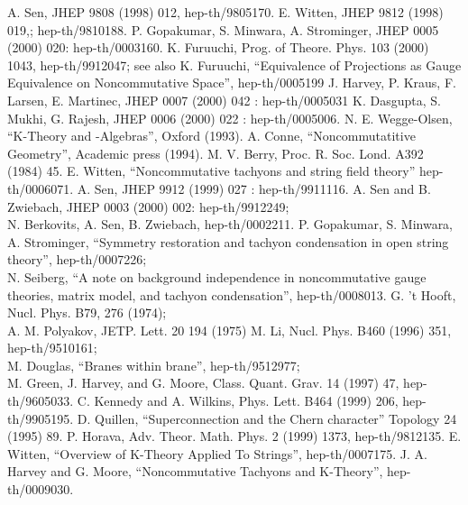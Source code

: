 \documentclass[a4paper,12pt]{article}
\begin{document}
\begin{thebibliography}{99}
 A. Sen, JHEP 9808 (1998) 012,
hep-th/9805170.
 E. Witten, JHEP 9812 (1998) 019,; hep-th/9810188.
  P. Gopakumar, S. Minwara, A. Strominger,
JHEP 0005 (2000) 020: hep-th/0003160.
 K. Furuuchi, Prog. of Theore. Phys. 103 (2000) 1043,
hep-th/9912047;
see also K. Furuuchi, 
``Equivalence of Projections as Gauge Equivalence on
Noncommutative Space'',
hep-th/0005199
  J. Harvey, P. Kraus, F. Larsen, E. Martinec, 
	JHEP 0007 (2000) 042 : hep-th/0005031 
 K. Dasgupta, S. Mukhi, G. Rajesh,
	JHEP 0006 (2000) 022 : hep-th/0005006.
 N. E. Wegge-Olsen, ``K-Theory
and \coordHE{}-Algebras'', Oxford (1993).
 A. Conne, ``Noncommutatitive Geometry'',
Academic press (1994).
 M. V. Berry, Proc. R. Soc. Lond. A392 (1984) 45.
 E. Witten, ``Noncommutative tachyons and string
field theory'' hep-th/0006071.
 A. Sen, JHEP 9912 (1999) 027 : hep-th/9911116.
 A. Sen and B. Zwiebach, JHEP 0003 (2000) 002:
	hep-th/9912249;\\
 N. Berkovits, A. Sen, B. Zwiebach, hep-th/0002211.
 P. Gopakumar, S. Minwara, A. Strominger,
``Symmetry restoration and tachyon condensation in open string theory'',
hep-th/0007226;\\
N. Seiberg, ``A note on background independence in
noncommutative gauge theories, matrix model, and tachyon condensation'',
hep-th/0008013.
 G. 't Hooft, Nucl. Phys. B79, 276 (1974);\\
A. M. Polyakov, JETP. Lett. 20 194 (1975)
 M. Li, Nucl. Phys. B460 (1996) 351,
hep-th/9510161;\\
M. Douglas, ``Branes within brane'', hep-th/9512977;\\
M. Green, J. Harvey, and G. Moore, Class. Quant. Grav.
14 (1997) 47, hep-th/9605033.
 C. Kennedy and A. Wilkins,
Phys. Lett. B464 (1999) 206, hep-th/9905195.
 D. Quillen, ``Superconnection and the
Chern character'' Topology 24 (1995) 89.
 P. Horava, Adv. Theor. Math. Phys. 2 (1999) 1373,
 hep-th/9812135.
 E. Witten, ``Overview of K-Theory
Applied To Strings'', hep-th/0007175.
 J. A. Harvey and G. Moore, 
``Noncommutative Tachyons and K-Theory'',
hep-th/0009030.
\end{thebibliography}
\end{document}
